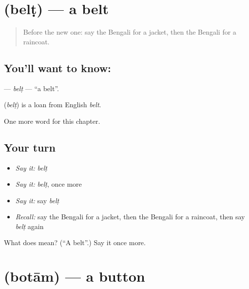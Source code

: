 \section[\texorpdfstring{\bn{বেল্ট} (belṭ)}{বেল্ট (belṭ)}]{ (belṭ) — a belt}

\label{lesson:BN-C195-belt}



\begin{quote}
Before the new one: say the Bengali for a jacket, then the Bengali for a raincoat.
\end{quote}

\subsection*{You'll want to know: }
\textbf{} — \emph{belṭ} — \textquotedblleft{}a belt\textquotedblright{}.

\begin{cousinweb}
\textbf{} (\emph{belṭ}) is a loan from English \emph{belt}.
\end{cousinweb}

\begin{grammarlens}[title={What you've built}]
One more word for this chapter.
\end{grammarlens}

\subsection*{Your turn}
\begin{itemize}
\raggedright
  \item \emph{Say it:} \emph{belṭ}
  \item \emph{Say it:} \emph{belṭ}, once more
  \item \emph{Say it:} say \emph{belṭ}
  \item \emph{Recall:} say the Bengali for a jacket, then the Bengali for a raincoat, then say \emph{belṭ} again
\end{itemize}

\begin{tcolorbox}[breakable,colback=teal!4,colframe=teal!35!black,title={Before you move on}]
What does  mean? (\textquotedblleft{}A belt\textquotedblright{}.) Say it once more.
\end{tcolorbox}
\section[\texorpdfstring{\bn{বোতাম} (botām)}{বোতাম (botām)}]{ (botām) — a button}

